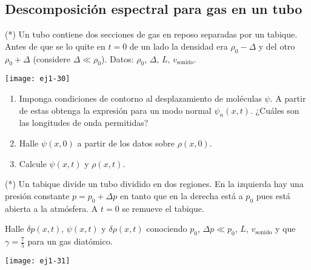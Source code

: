 \subsection*{Descomposición espectral para gas en un tubo}

\item
\begin{minipage}[t][1.6cm]{0.65\textwidth}
(*) Un tubo contiene dos secciones de gas en reposo separadas por un tabique.
Antes de que se lo quite en $t=0$ de un lado la densidad era $\rho_{0}-\Delta$ y del otro $\rho_{0}+\Delta$ (considere $\Delta\ll\rho_{0}$).
Datos: $\rho_{0}$, $\Delta$, $L$, $v_\text{sonido}$.
\end{minipage}
\begin{minipage}[c][2cm][t]{0.3\textwidth}
	\texttt{[image: ej1-30]}
\end{minipage}
\begin{enumerate}
	\item Imponga condiciones de contorno al desplazamiento de moléculas $\psi$.
	A partir de estas obtenga la expresión para un modo normal $\psi_{n}(x,t)$.
	¿Cuáles son las longitudes de onda permitidas?
	\item Halle $\psi(x,0)$ a partir de los datos sobre $\rho(x,0)$.
	\item Calcule $\psi(x,t)$ y $\rho(x,t)$.
\end{enumerate}


\item
\begin{minipage}[t][2cm]{0.65\textwidth}
(*) Un tabique divide un tubo dividido en dos regiones.
En la izquierda hay una presión constante $p = p_0 + \Delta p$ en tanto que en la derecha está a $p_0$ pues está abierta a la atmósfera.
A $t = 0$ se remueve el tabique.

Halle $\delta p(x,t)$, $\psi(x,t)$ y $\delta\rho(x,t)$ conociendo $p_0$, $\Delta p\ll p_0$, $L$, $v_\text{sonido}$ y que $\gamma= \frac{7}{5}$ para un gas diatómico.
\end{minipage}
\begin{minipage}[c][0.6cm][t]{0.3\textwidth}
	\texttt{[image: ej1-31]}
\end{minipage}


